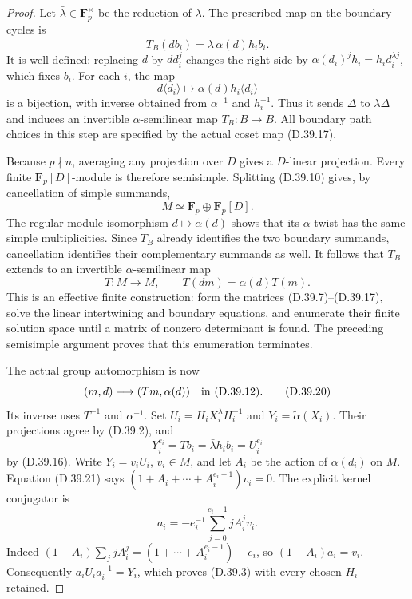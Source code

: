 \begin{proof}
Let \(\bar\lambda\in\mathbf F_p^\times\) be the
reduction of \(\lambda\).  The prescribed map on
the boundary cycles is
\[
 T_B(d b_i)=\bar\lambda\,\alpha(d)h_i b_i.
 \tag{D.39.16}
\]
It is well defined: replacing \(d\) by \(d d_i^j\)
changes the right side by
\(\alpha(d_i)^j h_i=h_i d_i^{\lambda j}\),
which fixes \(b_i\).
For each \(i\), the map
\[
 d\langle d_i\rangle\longmapsto
            \alpha(d)h_i\langle d_i\rangle
 \tag{D.39.17}
\]
is a bijection, with inverse obtained from
\(\alpha^{-1}\) and \(h_i^{-1}\).
Thus it sends \(\Delta\) to
\(\bar\lambda\Delta\) and induces an invertible
\(\alpha\)-semilinear map \(T_B:B\to B\).
All boundary path choices in this step are
specified by the actual coset map
\textup{(D.39.17)}.

Because \(p\nmid n\), averaging any projection
over \(D\) gives a \(D\)-linear projection.
Every finite \(\mathbf F_p[D]\)-module is
therefore semisimple.
Splitting \textup{(D.39.10)} gives, by cancellation
of simple summands,
\[
                    M\simeq\mathbf F_p\oplus\mathbf F_p[D].
 \tag{D.39.18}
\]
The regular-module isomorphism
\(d\mapsto\alpha(d)\) shows that its
\(\alpha\)-twist has the same simple multiplicities.
Since \(T_B\) already identifies the two boundary
summands, cancellation identifies their complementary
summands as well.
It follows that \(T_B\) extends to an invertible
\(\alpha\)-semilinear map
\[
              T:M\longrightarrow M,\qquad
              T(dm)=\alpha(d)T(m).
 \tag{D.39.19}
\]
This is an effective finite construction: form the
matrices \textup{(D.39.7)--(D.39.17)}, solve the
linear intertwining and boundary equations, and
enumerate their finite solution space until a
matrix of nonzero determinant is found.
The preceding semisimple argument proves that
this enumeration terminates.

The actual group automorphism is now
\[
 (m,d)\longmapsto(Tm,\alpha(d))
             \quad\text{in \textup{(D.39.12)}}.
 \tag{D.39.20}
\]
Its inverse uses \(T^{-1}\) and \(\alpha^{-1}\).
Set \(U_i=H_iX_i^\lambda H_i^{-1}\) and
\(Y_i=\widetilde\alpha(X_i)\).
Their projections agree by \textup{(D.39.2)}, and
\[
 Y_i^{e_i}=T b_i=\bar\lambda h_i b_i=U_i^{e_i}
 \tag{D.39.21}
\]
by \textup{(D.39.16)}.
Write \(Y_i=v_iU_i\), \(v_i\in M\), and let
\(A_i\) be the action of \(\alpha(d_i)\) on \(M\).
Equation \textup{(D.39.21)} says
\((1+A_i+\cdots+A_i^{e_i-1})v_i=0\).
The explicit kernel conjugator is
\[
       a_i=-e_i^{-1}\sum_{j=0}^{e_i-1}jA_i^j v_i.
 \tag{D.39.22}
\]
Indeed
\((1-A_i)\sum_j jA_i^j
 =(1+\cdots+A_i^{e_i-1})-e_i\),
so \((1-A_i)a_i=v_i\).
Consequently \(a_iU_i a_i^{-1}=Y_i\), which proves
\textup{(D.39.3)} with every chosen \(H_i\) retained.


\end{proof}

